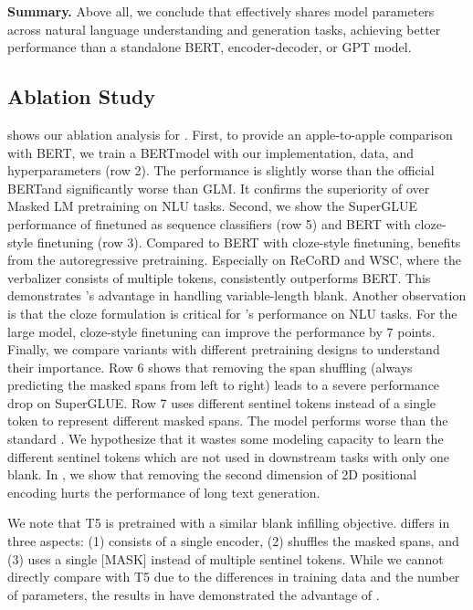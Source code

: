 \textbf{Summary.} 
Above all, we conclude that \model effectively shares model parameters across natural language understanding and generation tasks, achieving better performance than a standalone BERT, encoder-decoder, or GPT model. 


\subsection{Ablation Study}
\label{subsec:ablation}

 shows our ablation analysis for \model. First, to provide an apple-to-apple comparison with BERT, we train a BERT\largem model  with our implementation, data, and hyperparameters (row 2). The performance is slightly worse than the official BERT\largem and significantly worse than GLM\largem. It confirms the superiority of \model over Masked LM pretraining on NLU tasks. Second, 
we show the SuperGLUE performance of \model finetuned as sequence classifiers (row 5) and BERT with cloze-style finetuning (row 3). Compared to BERT with cloze-style finetuning, \model benefits from the autoregressive pretraining. Especially on ReCoRD and WSC, where the verbalizer consists of multiple tokens, \model consistently outperforms BERT. This demonstrates \model's advantage in handling variable-length blank. Another observation is that the cloze formulation is critical for \model's performance on NLU tasks. For the large model, cloze-style finetuning can improve the performance by 7 points. Finally, we compare \model variants with different pretraining designs to understand their importance. Row 6 shows that removing the span shuffling (always predicting the masked spans from left to right) leads to a severe performance drop on SuperGLUE. Row 7 uses different sentinel tokens instead of a single  token to represent different masked spans. The model performs worse than the standard \model. We hypothesize that it wastes some modeling capacity to learn the different sentinel tokens which are not used in downstream tasks with only one blank. In , we show that removing the second dimension of 2D positional encoding hurts the performance of long text generation.

We note that T5 is pretrained with a similar blank infilling objective. \model differs in three aspects: (1) \model consists of a single encoder, (2) \model shuffles the masked spans, and (3) \model uses a single [MASK] instead of multiple sentinel tokens. While we cannot directly compare \model with T5 due to the differences in training data and the number of parameters, the results in  have demonstrated the advantage of \model.